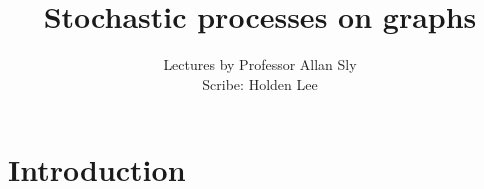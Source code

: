 \def\filepath{templates}








\def\name{Stochastic processes on graphs}


\pagestyle{fancy}
\chead{} 
\lfoot{} 
\cfoot{\thepage} 
\rfoot{} %
\renewcommand{\headrulewidth}{.3pt} 
\setlength\voffset{0in}


%
\title{Stochastic processes on graphs}
\author{Lectures by Professor Allan Sly\\ Scribe: Holden Lee}
\maketitle


\tableofcontents


\chapter*{Introduction}


